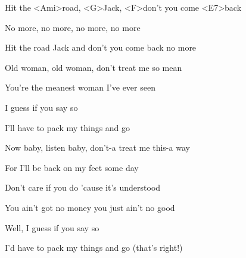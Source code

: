 
\zr
Hit the <Ami>road, <G>Jack, <F>don't you come <E7>back

No more, no more, no more, no more

Hit the road Jack and don't you come back no more

\kr
\zs

Old woman, old woman, don't treat me so mean

You're the meanest woman I've ever seen

I guess if you say so

I'll have to pack my things and go

\ks

\zr
\kr

\zs

Now baby, listen baby, don't-a treat me this-a way

For I'll be back on my feet some day

Don't care if you do 'cause it's understood

You ain't got no money you just ain't no good


Well, I guess if you say so

I'd have to pack my things and go (that's right!)

\ks

\zr
\kr

\zr
\kr

\kp
